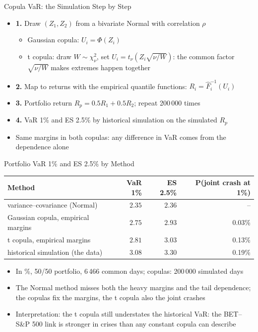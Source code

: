 \begin{frame}{Copula VaR: the Simulation Step by Step}
\itemsize{\small}
\begin{itemize}
    \item \textbf{1.} Draw $(Z_1, Z_2)$ from a bivariate Normal with correlation $\rho$
    \begin{itemize}
        \item Gaussian copula: $U_i = \Phi(Z_i)$
        \item t copula: draw $W \sim \chi^2_\nu$, set $U_i = t_\nu(Z_i\sqrt{\nu/W})$: the common factor $\sqrt{\nu/W}$ makes extremes happen together
    \end{itemize}
    \item \textbf{2.} Map to returns with the empirical quantile functions: $R_i = \hat F_i^{-1}(U_i)$
    \item \textbf{3.} Portfolio return $R_p = 0.5R_1 + 0.5R_2$; repeat 200\,000 times
    \item \textbf{4.} VaR 1\% and ES 2.5\% by historical simulation on the simulated $R_p$
    \item Same margins in both copulas: any difference in VaR comes from the dependence alone
\end{itemize}
\end{frame}

\begin{frame}{Portfolio VaR 1\% and ES 2.5\% by Method}
\itemsize{\footnotesize}
\begin{center}
\footnotesize
\begin{tabular}{lrrr}
\toprule
Method & VaR 1\% & ES 2.5\% & P(joint crash at 1\%) \\
\midrule
variance--covariance (Normal) & $2.35$ & $2.36$ & -- \\
Gaussian copula, empirical margins & $2.75$ & $2.93$ & 0.03\% \\
t copula, empirical margins & $2.81$ & $3.03$ & 0.13\% \\
historical simulation (the data) & $3.08$ & $3.30$ & 0.19\% \\
\bottomrule
\end{tabular}
\end{center}
\begin{itemize}
    \item In \%, 50/50 portfolio, 6\,466 common days; copulas: 200\,000 simulated days
    \item The Normal method misses both the heavy margins and the tail dependence; the copulas fix the margins, the t copula also the joint crashes
    \item Interpretation: the t copula still understates the historical VaR: the BET--S\&P 500 link is stronger in crises than any constant copula can describe
\end{itemize}
\end{frame}


